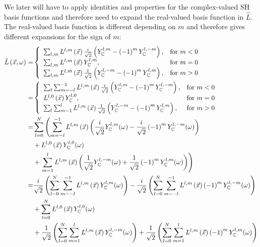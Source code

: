\documentclass[10pt]{scrartcl}
\begin{document}
We later will have to apply identities and properties for the complex-valued SH basis functions and therefore need to expand the real-valued basis function in $\hat{L}$. The real-valued basis function is different depending on $m$ and therefore gives different expansions for the sign of $m$:
\begin{align}
\hat{L}\left(\vec{x}, \omega\right)
=&
\left\{
\begin{array}{lr}
\sum_{l,m}L^{l,m}\left(\vec{x}\right)\frac{{i\mkern1mu}}{\sqrt{2}}\left(Y_{\mathbb{C}}^{l,m}-\left(-1\right)^mY_{\mathbb{C}}^{l,-m}\right), & \text{for } m < 0\\
\sum_{l,m}L^{l,m}\left(\vec{x}\right)Y_{\mathbb{C}}^{l,m}, & \text{for } m = 0\\
\sum_{l,m}L^{l,m}\left(\vec{x}\right)\frac{1}{\sqrt{2}}\left(Y_{\mathbb{C}}^{l,-m}-\left(-1\right)^mY_{\mathbb{C}}^{l,m}\right), & \text{for } m > 0
\end{array}
\right.
\nonumber\\
=&
\left\{
\begin{array}{lr}
\sum_{l}\sum_{m=-l}^{-1}L^{l,m}\left(\vec{x}\right)\frac{{i\mkern1mu}}{\sqrt{2}}\left(Y_{\mathbb{C}}^{l,m}-\left(-1\right)^mY_{\mathbb{C}}^{l,-m}\right), & \text{for } m < 0\\
L^{l,0}\left(\vec{x}\right)Y_{\mathbb{C}}^{l,0}, & \text{for } m = 0\\
\sum_{l}\sum_{m=1}^{l}L^{l,m}\left(\vec{x}\right)\frac{1}{\sqrt{2}}\left(Y_{\mathbb{C}}^{l,-m}-\left(-1\right)^mY_{\mathbb{C}}^{l,m}\right), & \text{for } m > 0
\end{array}
\right.
\nonumber\\
=&
\sum_{l=0}^{N}
\left(
\sum_{m=-l}^{-1}
{
L^{{l,m}}\left (\vec{x} \right )\left(\frac{i}{\sqrt{2}}Y_{\mathbb{C}}^{l, m}(\omega )-\frac{i}{\sqrt{2}}\left({-1}\right)^{m}Y_{\mathbb{C}}^{l, -m}(\omega )\right)
}
\right.
\nonumber\\
&
+L^{l,0}\left (\vec{x} \right )Y_{\mathbb{C}}^{l, 0}(\omega )
\nonumber\\
&
+
\left.
\sum_{m=1}^{l}
{
L^{{l,m}}\left (\vec{x} \right )\left(\frac{1}{\sqrt{2}}Y_{\mathbb{C}}^{l, -m}(\omega )+\frac{1}{\sqrt{2}}\left({-1}\right)^{m}Y_{\mathbb{C}}^{l, m}(\omega )\right)
}
\right)
\nonumber\\=&
\frac{i}{\sqrt{2}}\left(\sum_{l=0}^{N}{\sum_{m=-l}^{-1}{L^{{l,m}}\left (\vec{x} \right )Y_{\mathbb{C}}^{l, m}(\omega )}}\right)
-\frac{i}{\sqrt{2}}\left(\sum_{l=0}^{N}{\sum_{m=-l}^{-1}{L^{{l,m}}\left (\vec{x} \right )\left({-1}\right)^{m}Y_{\mathbb{C}}^{l, -m}(\omega )}}\right)
\nonumber\\&
+\sum_{l=0}^{N}{L^{{l,0}}\left (\vec{x} \right )Y_{\mathbb{C}}^{l, 0}(\omega )}
\nonumber\\&
+\frac{1}{\sqrt{2}}\left(\sum_{l=0}^{N}{\sum_{m=1}^{l}{L^{{l,m}}\left (\vec{x} \right )Y_{\mathbb{C}}^{l, -m}(\omega )}}\right)
+\frac{1}{\sqrt{2}}\left(\sum_{l=0}^{N}{\sum_{m=1}^{l}{L^{{l,m}}\left (\vec{x} \right )\left({-1}\right)^{m}Y_{\mathbb{C}}^{l, m}(\omega )}}\right)
\end{align}
\end{document}

